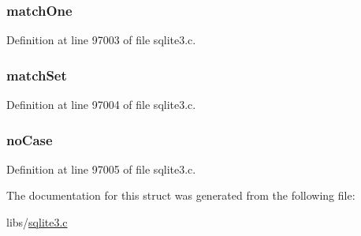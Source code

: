 \subsubsection[{match\+One}]{ match\+One}\label{structcompare_info_a4ae1749bf3b674cfbbbed3c7a3e5f1bf}


Definition at line 97003 of file sqlite3.\+c.

\hypertarget{structcompare_info_a6fc78a6eb94f7330a73bdbdfca0b9d4c}{}
\subsubsection[{match\+Set}]{ match\+Set}\label{structcompare_info_a6fc78a6eb94f7330a73bdbdfca0b9d4c}


Definition at line 97004 of file sqlite3.\+c.

\hypertarget{structcompare_info_adb8e657989ec8b8c76073415b0bcad5c}{}
\subsubsection[{no\+Case}]{ no\+Case}\label{structcompare_info_adb8e657989ec8b8c76073415b0bcad5c}


Definition at line 97005 of file sqlite3.\+c.



The documentation for this struct was generated from the following file\+:\begin{DoxyCompactItemize}
\item 
libs/\hyperlink{sqlite3_8c}{sqlite3.\+c}\end{DoxyCompactItemize}
